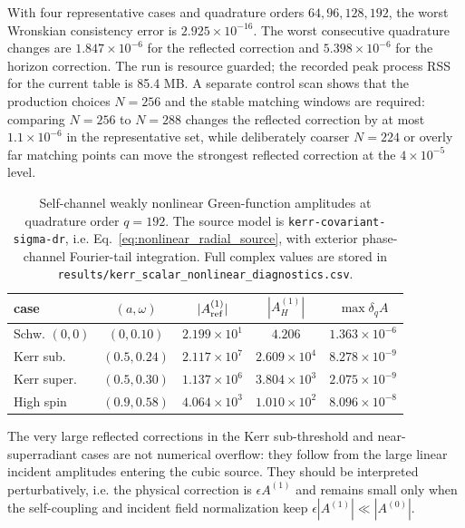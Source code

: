 \documentclass[aps,prd,twocolumn,nofootinbib,superscriptaddress,10pt]{revtex4-2}
\begin{document}
With four representative cases and quadrature orders $64,96,128,192$, the
worst Wronskian consistency error is $2.925\times10^{-16}$.  The worst
consecutive quadrature changes are $1.847\times10^{-6}$ for the reflected
correction and $5.398\times10^{-6}$ for the horizon correction.  The run is
resource guarded; the recorded peak process RSS for the current table is
85.4 MB.  A separate control scan shows that the production choices
$N=256$ and the stable matching windows are required: comparing $N=256$ to
$N=288$ changes the reflected correction by at most $1.1\times10^{-6}$ in the
representative set, while deliberately coarser $N=224$ or overly far matching
points can move the strongest reflected correction at the $4\times10^{-5}$
level.

\begin{table}[t]
\caption{Self-channel weakly nonlinear Green-function amplitudes at quadrature
order $q=192$.  The source model is
\texttt{kerr-covariant-sigma-dr}, i.e. Eq.~\eqref{eq:nonlinear_radial_source},
with exterior phase-channel Fourier-tail integration.  Full complex values are
stored in
\texttt{results/kerr\_scalar\_nonlinear\_diagnostics.csv}.}
\label{tab:nonlinear_diag}
\scriptsize
\begin{ruledtabular}
\begin{tabular}{lcccc}
case & $(a,\omega)$ &
$|A_{\rm ref}^{(1)}|$ & $|A_{H}^{(1)}|$ &
$\max\delta_q A$\\
\hline
Schw. $(0,0)$ & $(0,0.10)$ & $2.199\times10^{1}$ &
$4.206$ & $1.363\times10^{-6}$\\
Kerr sub. & $(0.5,0.24)$ & $2.117\times10^{7}$ &
$2.609\times10^{4}$ & $8.278\times10^{-9}$\\
Kerr super. & $(0.5,0.30)$ & $1.137\times10^{6}$ &
$3.804\times10^{3}$ & $2.075\times10^{-9}$\\
High spin & $(0.9,0.58)$ & $4.064\times10^{3}$ &
$1.010\times10^{2}$ & $8.096\times10^{-8}$\\
\end{tabular}
\end{ruledtabular}
\end{table}

The very large reflected corrections in the Kerr sub-threshold and
near-superradiant cases are not numerical overflow: they follow from the
large linear incident amplitudes entering the cubic source.  They should be
interpreted perturbatively, i.e. the physical correction is
$\epsilon A^{(1)}$ and remains small only when the self-coupling and incident
field normalization keep $\epsilon |A^{(1)}|\ll |A^{(0)}|$.
\end{document}
